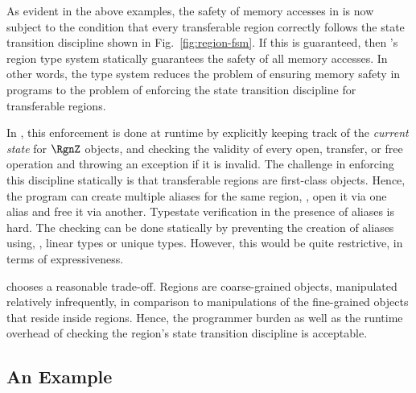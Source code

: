 
As evident in the above examples, the safety of memory accesses in
\name is now subject to the condition that every transferable region
correctly follows the state transition discipline shown
in Fig.~\ref{fig:region-fsm}. If this is
guaranteed, then \name's region type system statically guarantees the
safety of all memory accesses. In other words, the type system reduces
the problem of ensuring memory safety in \name programs to the problem
of enforcing the state transition discipline for transferable regions.

In \name, this enforcement is done at runtime by explicitly keeping
track of the \emph{current state} for $\RgnZ$ objects, and
checking the validity of every open, transfer, or free operation
and throwing an exception if it is invalid.
The challenge in enforcing this discipline statically is that transferable regions
are first-class objects. Hence, the program can create multiple aliases for
the same region, \eg, open it via one alias and free it via another.
Typestate verification in the presence of aliases is hard.
The checking can be done statically by preventing the creation of aliases using, \eg, linear types
or unique types. However, this would be quite restrictive, in terms of expressiveness.

\name chooses a reasonable trade-off. Regions are coarse-grained objects, manipulated relatively infrequently,
in comparison to manipulations of the fine-grained objects that reside inside regions. Hence, the programmer burden
as well as the runtime overhead of checking the region's state transition discipline is acceptable.



\subsection{An Example}

